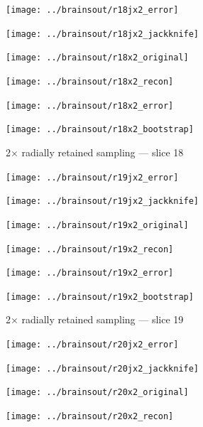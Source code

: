 \documentclass[article]{jdssv}
\begin{document}
\begin{appendix}
\begin{figure}
\begin{centering}
\parbox{\imsize}{\texttt{[image: ../brainsout/r18jx2\_error]}}
\parbox{\imsize}{\texttt{[image: ../brainsout/r18jx2\_jackknife]}}

\vspace{\vertsep}

\parbox{\imsize}{\texttt{[image: ../brainsout/r18x2\_original]}}
\parbox{\imsize}{\texttt{[image: ../brainsout/r18x2\_recon]}}

\vspace{\vertsep}

\parbox{\imsize}{\texttt{[image: ../brainsout/r18x2\_error]}}
\parbox{\imsize}{\texttt{[image: ../brainsout/r18x2\_bootstrap]}}

\end{centering}
\caption{2$\times$ radially retained sampling --- slice 18}
\end{figure}


\begin{figure}
\begin{centering}

\parbox{\imsize}{\texttt{[image: ../brainsout/r19jx2\_error]}}
\parbox{\imsize}{\texttt{[image: ../brainsout/r19jx2\_jackknife]}}

\vspace{\vertsep}

\parbox{\imsize}{\texttt{[image: ../brainsout/r19x2\_original]}}
\parbox{\imsize}{\texttt{[image: ../brainsout/r19x2\_recon]}}

\vspace{\vertsep}

\parbox{\imsize}{\texttt{[image: ../brainsout/r19x2\_error]}}
\parbox{\imsize}{\texttt{[image: ../brainsout/r19x2\_bootstrap]}}

\end{centering}
\caption{2$\times$ radially retained sampling --- slice 19}
\end{figure}


\begin{figure}
\begin{centering}

\parbox{\imsize}{\texttt{[image: ../brainsout/r20jx2\_error]}}
\parbox{\imsize}{\texttt{[image: ../brainsout/r20jx2\_jackknife]}}

\vspace{\vertsep}

\parbox{\imsize}{\texttt{[image: ../brainsout/r20x2\_original]}}
\parbox{\imsize}{\texttt{[image: ../brainsout/r20x2\_recon]}}

\vspace{\vertsep}


\end{centering}
\end{figure}
\end{appendix}
\end{document}
